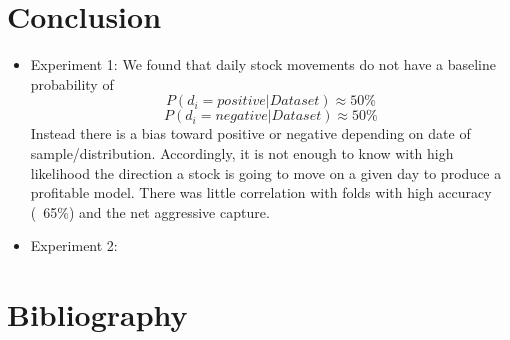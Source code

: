 \documentclass[11pt,letterpaper]{article}
\newcommand{\blue}[1]{\textcolor{RoyalBlue}{#1}}
\newcommand{\instructions}[1]{\blue{\textit{#1}}}
\begin{document}
\section{Conclusion}
\begin{itemize}
\item Experiment 1: We found that daily stock movements do not have a
  baseline probability of
\[
  	P(\text{\(d_i = positive\)} | \text{\(Dataset\)}) \approx 50\%
\]
\[
  	P(\text{\(d_i = negative\)} | \text{\(Dataset\)}) \approx 50\%
\]
  Instead there is a bias toward positive or negative depending on date of sample/distribution.
  Accordingly, it is not enough to know with high likelihood the direction a
  stock is going to move on a given day to produce a profitable model. There
  was little correlation with folds with high accuracy (~65\%) and the
  net aggressive capture.
\item Experiment 2:
\end{itemize}


\section*{Bibliography}
{}

\end{document}
